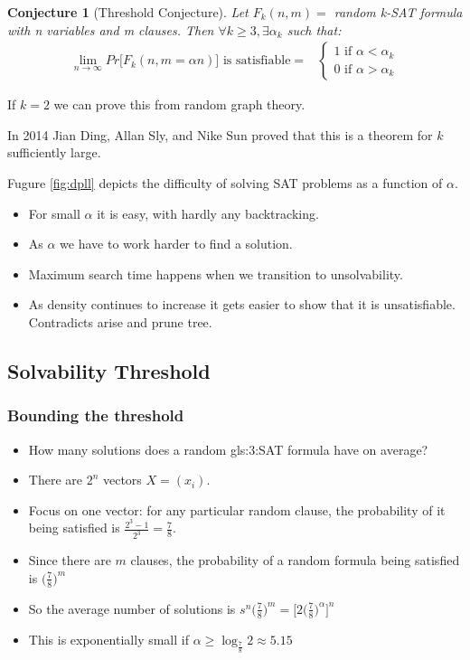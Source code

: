 \documentclass[]{article}
\newtheorem{conj}{Conjecture}
\begin{document}
\begin{conj}[Threshold Conjecture]
	Let $F_k(n,m) = $ random k-SAT formula with n variables and m clauses. Then $\forall k \ge 3, \exists \alpha_k$ such that:
	\begin{align*}
		\lim_{n \rightarrow \infty} Pr\big[F_k(n,m=\alpha n)\big]\text{ is satisfiable}=&\begin{cases}
		1 \text{ if } \alpha<\alpha_k\\
		0  \text{ if } \alpha>\alpha_k
		\end{cases}
	\end{align*}
\end{conj}

If $k=2$ we can prove this from random graph theory.

In 2014 Jian Ding, Allan Sly, and Nike Sun proved that this is a theorem for $k$ sufficiently large\cite{ding2015proof}.

Fugure \ref{fig:dpll} depicts the difficulty of solving SAT problems as a function of $\alpha$. \begin{itemize}
	\item For small $\alpha$ it is easy, with hardly any backtracking.
	\item As $\alpha$ we have to work harder to find a solution.
	\item Maximum search time happens when we transition to unsolvability.
	\item As density continues to increase it gets easier to show that it is unsatisfiable. Contradicts arise and prune tree.
\end{itemize}

\subsection{Solvability Threshold}

\subsubsection{Bounding the threshold}
\begin{itemize}
	\item How many solutions does a random \gls{gls:3:SAT} formula have on average?
	\item There are $2^n$ vectors $X=(x_i)$. 
	\item Focus on one vector: for any particular random clause, the probability of it being satisfied is $\frac{2^3-1}{2^3} = \frac{7}{8}$.
	\item Since there are $m$ clauses, the probability of a random formula being satisfied is  $\big(\frac{7}{8}\big)^m$
	\item So the average number of solutions is $s^n\big(\frac{7}{8}\big)^m=\big[2\big(\frac{7}{8}\big)^\alpha\big]^n$
	\item This is exponentially small if $\alpha \ge \log_{\frac{7}{8}}2\approx5.15$
\end{itemize}
\end{document}
